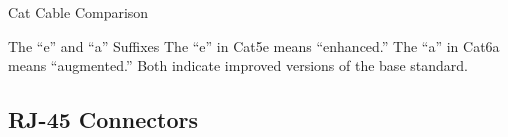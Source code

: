 \documentclass[aspectratio=169]{beamer}  %
\begin{document}
\begin{frame}[t,shrink=12]{Cat Cable Comparison}
    \vspace{0.3em}
    \begin{exampleblock}{The ``e'' and ``a'' Suffixes}
        The ``e'' in Cat5e means ``enhanced.'' The ``a'' in Cat6a means ``augmented.'' Both indicate improved versions of the base standard.
    \end{exampleblock}
\end{frame}

\subsection{RJ-45 Connectors}
\end{document}
